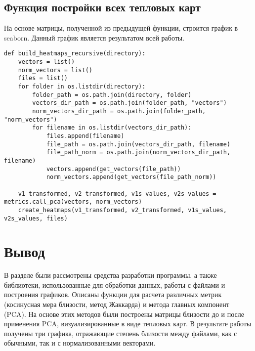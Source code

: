 \subsection{Функция постройки всех тепловых карт}

На основе матрицы, полученной из предыдущей функции, строится график в seaborn. Данный график является результатом всей работы.

\begin{lstlisting}[label=main, caption={Функция main}]
    def build_heatmaps_recursive(directory):
    vectors = list()
    norm_vectors = list()
    files = list()
    for folder in os.listdir(directory):
        folder_path = os.path.join(directory, folder)
        vectors_dir_path = os.path.join(folder_path, "vectors")
        norm_vectors_dir_path = os.path.join(folder_path, "norm_vectors")
        for filename in os.listdir(vectors_dir_path):
            files.append(filename)
            file_path = os.path.join(vectors_dir_path, filename)
            file_path_norm = os.path.join(norm_vectors_dir_path, filename)
            vectors.append(get_vectors(file_path))
            norm_vectors.append(get_vectors(file_path_norm))

    v1_transformed, v2_transformed, v1s_values, v2s_values = metrics.call_pca(vectors, norm_vectors)
    create_heatmaps(v1_transformed, v2_transformed, v1s_values, v2s_values, files)
\end{lstlisting}

\section*{Вывод}

В разделе были рассмотрены средства разработки программы, а также библиотеки, использованные для обработки данных, работы с файлами и построения графиков. 
Описаны функции для расчета различных метрик (косинусная мера близости, метод Жаккарда) и метода главных компонент (PCA). 
На основе этих методов были построены матрицы близости до и после применения PCA, визуализированные в виде тепловых карт. 
В результате работы получены три графика, отражающие степень близости между файлами, как с обычными, так и с нормализованными векторами.

\clearpage
